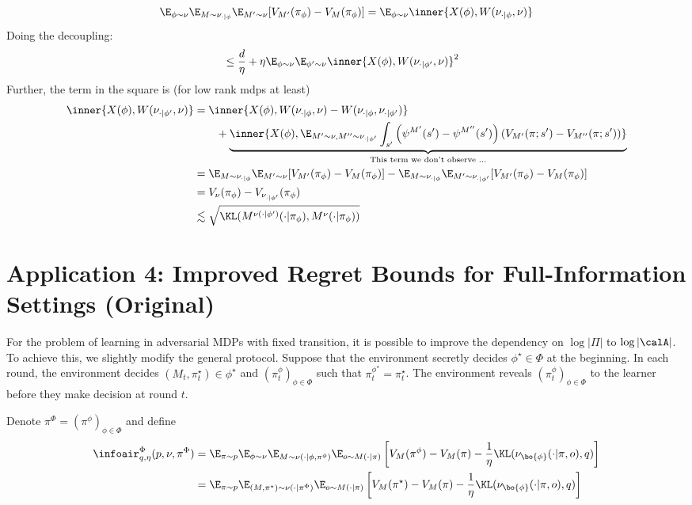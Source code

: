 \begin{align*}
\E_{\phi\sim\nu}\E_{M\sim\nu_{\cdot|\phi}}\E_{M'\sim\nu}[V_{M'}(\pi_{\phi})-V_{M}(\pi_\phi)] = \E_{\phi\sim\nu}\inner{X(\phi), W(\nu_{\cdot|\phi},\nu)}
\end{align*}
Doing the decoupling:
\begin{align*}
&\leq \frac{d}{\eta} + \eta \E_{\phi\sim\nu}\E_{\phi'\sim\nu}\inner{X(\phi),W(\nu_{\cdot|\phi'},\nu)}^2
\end{align*}
Further, the term in the square is (for low rank mdps at least)
  
\begin{align*}
\inner{X(\phi),W(\nu_{\cdot|\phi'},\nu)} &= \inner{X(\phi),W(\nu_{\cdot|\phi},\nu)-W(\nu_{\cdot|\phi},\nu_{\cdot|\phi'})}\\
&\qquad + \underbrace{\inner{X(\phi),\E_{M'\sim\nu,M''\sim\nu_{\cdot|\phi'}}\int_{s'}\left(\psi^{M'}(s')-\psi^{M''}(s')\right)(V_{M'}(\pi;s')-V_{M''}(\pi;s'))}}_{\text{This term we don't observe ...}}   \\
&=\E_{M\sim\nu_{\cdot|\phi}}\E_{M'\sim\nu}[V_{M'}(\pi_{\phi})-V_{M}(\pi_{\phi})]-\E_{M\sim\nu_{\cdot|\phi}}\E_{M'\sim\nu_{\cdot|\phi'}}[V_{M'}(\pi_{\phi})-V_{M}(\pi_{\phi})]\\
&=V_{\nu}(\pi_{\phi})-V_{\nu_{\cdot|\phi'}}(\pi_{\phi})\\
&\lesssim \sqrt{\KL(M^{\nu(\cdot|\phi')}(\cdot|\pi_{\phi}),M^{\nu}(\cdot|\pi_{\phi}))} 
\end{align*}


\section{Application 4: Improved Regret Bounds for Full-Information Settings (Original)}

For the problem of learning in adversarial MDPs with fixed transition, it is possible to improve the dependency on $\log|\Pi|$ to $\log|\calA|$. To achieve this, we slightly modify the general protocol. Suppose that the environment secretly decides $\phi^\star\in\Phi$ at the beginning. In each round, the environment decides $(M_t, \pi_t^{\star})\in\phi^\star$ and $(\pi_t^\phi)_{\phi\in\Phi}$ such that $\pi_t^{\phi^\star}=\pi_t^\star$. The environment reveals $(\pi_t^\phi)_{\phi\in\Phi}$ to the learner before they make decision at round $t$. 

Denote $\pi^\Phi=(\pi^\phi)_{\phi\in\Phi}$ and define
\begin{align*}
    \infoair^\Phi_{q,\eta}(p,\nu,\pi^\Phi) &= \E_{\pi\sim p} \E_{\phi\sim \nu} \E_{M\sim \nu(\cdot|\phi, \pi^\phi)} \E_{o\sim M(\cdot|\pi)}\left[V_M(\pi^\phi) - V_M(\pi) - \frac{1}{\eta} \KL(\nu_{\bo{\phi}}(\cdot|\pi, o), q)\right] \\
    &= \E_{\pi\sim p} \E_{(M,\pi^\star)\sim \nu(\cdot| \pi^\Phi)} \E_{o\sim M(\cdot|\pi)}\left[V_M(\pi^\star) - V_M(\pi) - \frac{1}{\eta} \KL(\nu_{\bo{\phi}}(\cdot|\pi, o), q)\right]
\end{align*}

